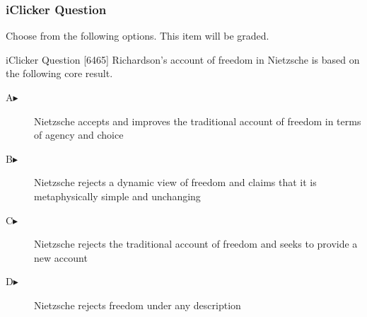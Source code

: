 \begin{frame}
  \frametitle{iClicker Question}
Choose from the following options. This item will be graded.
\begin{block}{iClicker Question}
[6465] Richardson's account of freedom in Nietzsche is based on the following core result.
\end{block}
\begin{description}
\item[A\hspace{.2in}$\blacktriangleright$] Nietzsche accepts and improves the traditional account of freedom in terms of agency and choice
\item[B\hspace{.2in}$\blacktriangleright$] Nietzsche rejects a dynamic view of freedom and claims that it is metaphysically simple and unchanging
\item[C\hspace{.2in}$\blacktriangleright$] Nietzsche rejects the traditional account of freedom and seeks to provide a new account
\item[D\hspace{.2in}$\blacktriangleright$] Nietzsche rejects freedom under any description
\end{description}
\end{frame}